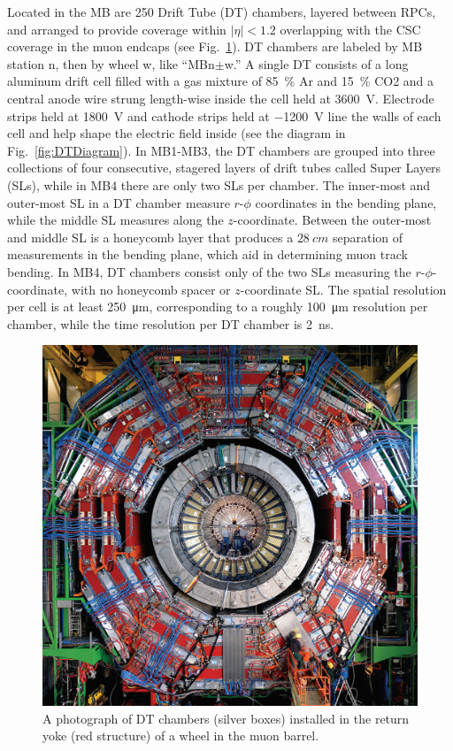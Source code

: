 

Located in the MB are 250 Drift Tube (DT) chambers, layered between RPCs, and arranged to provide coverage within $|\eta|<1.2$ overlapping with the CSC coverage in the muon endcaps (see Fig.~\ref{fig:DT}). DT chambers are labeled by MB station n, then by wheel w, like ``MBn$\pm$w.'' A single DT consists of a long aluminum drift cell filled with a gas mixture of 85~\% Ar and 15~\% CO2 and a central anode wire strung length-wise inside the cell held at \SI{+3600}{V}. Electrode strips held at \SI{+1800}{V} and cathode strips held at \SI{-1200}{V} line the walls of each cell and help shape the electric field inside (see the diagram in Fig.~\ref{fig:DTDiagram}). In MB1-MB3, the DT chambers are grouped into three collections of four consecutive, stagered layers of drift tubes called Super Layers (SLs), while in MB4 there are only two SLs per chamber. The inner-most and outer-most SL in a DT chamber measure $r$-$\phi$ coordinates in the bending plane, while the middle SL measures along the $z$-coordinate. Between the outer-most and middle SL is a honeycomb layer that produces a $\SI{28}{cm}$ separation of measurements in the bending plane, which aid in determining muon track bending. In MB4, DT chambers consist only of the two SLs measuring the $r$-$\phi$-coordinate, with no honeycomb spacer or $z$-coordinate SL. The spatial resolution per cell is at least \SI{250}{\micro\meter}, corresponding to a roughly \SI{100}{\micro\meter} resolution per chamber, while the time resolution per DT chamber is \SI{2}{ns}.

\begin{figure}[H]
    \centering
    \includegraphics[width=\textwidth]{Images/CMS/DT.jpg}
    \caption{A photograph of DT chambers (silver boxes) installed in the return yoke (red structure) of a wheel in the muon barrel.}
    \label{fig:DT}
\end{figure}

